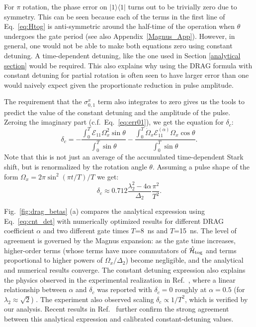 \documentclass[superscriptaddress,amsmath,amssymb,aps,twocolumn,praplied,notitlepage]{revtex4-2}
\newcommand{\ket}[1]{\vert #1 \rangle}
\newcommand{\bra}[1]{\langle #1 \vert}
\begin{document}
For $\pi$ rotation, the phase error on $\ket{1}\bra{1}$ turns out to be trivially zero due to symmetry. This can be seen because each of the terms in the first line of  Eq.~\ref{eq:Htog} is anti-symmetric around the half-time of the operation when $\theta$ undergoes the gate  period (see also Appendix~\ref{Magnus_App}).  However, in general, one would not be able to make both equations zero using constant detuning. A time-dependent detuning, like the one used in Section \ref{analytical section} would be required. This also explains why using the DRAG formula with constant detuning for partial rotation is often seen to have larger error than one would naively expect given the proportionate reduction in pulse amplitude.


The requirement that the $\sigma^x_{0,1}$  term also integrates to zero gives us the  tools to predict the value of the constant detuning and the amplitude of the pulse. Zeroing the imaginary part (c.f.~Eq.~\ref{eq:err01}), we get the equation for $\delta_c$:
\begin{equation}
    \delta_c = -\frac{\int_0^T\mathcal{E}_{11}\Omega_x^2\sin{\theta}}{\int_0^T\sin{\theta}}-\frac{\int_0^T\dot{\Omega}_x\mathcal{E}^{(\alpha)}_{11}\Omega_x\cos{\theta}}{\int_0^T\sin{\theta}}.
    \label{eq:cnt_det_comp}
\end{equation}
Note that this is not just an average of the accumulated time-dependent Stark shift, but is renormalized by the rotation angle $\theta$.
Assuming a pulse shape of the form $\Omega_x=2\pi\sin^2({\pi t/T})/T$ we get:
\begin{equation}
    \delta_{c}\approx0.712\frac{\lambda_2^2-4\alpha}{\Delta_2}\frac{\pi^2}{T^2}. 
    \label{eq:cnt_det}
\end{equation}

Fig.~\ref{fig:drag_betas} (a) compares the analytical expression using Eq.~\ref{eq:cnt_det} with numerically optimized results for different DRAG coefficient $\alpha$ and two different gate times $T$=8~ns and $T$=15~ns. The level of agreement is governed by the Magnus expansion: as the gate time increases, higher-order terms {(whose terms have more commutators of $\hat{\mathcal{H}}_{\rm{tog}}$ and terms proportional to higher powers of $\Omega_x/\Delta_2$)} become negligible, and the analytical and numerical results converge. The constant detuning expression also explains the physics observed in the experimental realization in Ref.~\cite{PhysRevLett.116.020501}, where a linear relationship between $\alpha$ and $\delta_{c}$ was reported with $\delta_{c}=0$ roughly at $\alpha=0.5$ (for $\lambda_2\approx\sqrt{2}$) \cite{PhysRevA.83.012308}. The experiment also observed scaling $\delta_{c} \propto 1/T^2$, which is verified by our analysis. Recent results in Ref.~\cite{GAO2025} further confirm the strong agreement between this analytical expression and calibrated constant-detuning values.
\end{document}
